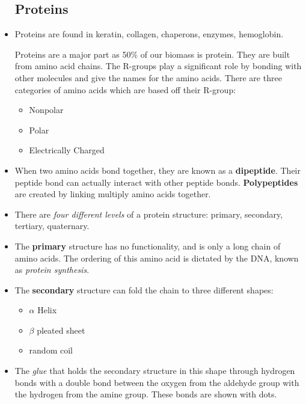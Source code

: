 \documentclass[letterpaper]{article}
\numberwithin{equation}{section}
\theoremstyle{classic}
\begin{document}
\begin{itemize}
    \subsection{Proteins}
    \item Proteins are found in keratin, collagen, chaperons, enzymes, hemoglobin.
    \begin{idea}
        Proteins are a major part as 50\% of our biomass is protein. They are built from amino acid chains. The R-groups play a significant role by bonding with other molecules and give the names for the amino acids. There are three categories of amino acids which are based off their R-group:
        \begin{multicols}{3}
        \begin{itemize}
            \item Nonpolar
            \item Polar
            \item Electrically Charged
        \end{itemize}
        \end{multicols}
    \end{idea}
    \item When two amino acids bond together, they are known as a \textbf{dipeptide}. Their peptide bond can actually interact with other peptide bonds. \textbf{Polypeptides} are created by linking multiply amino acids together.
    \item There are \textit{four different levels} of a protein structure: primary, secondary, tertiary, quaternary.
    \item The \textbf{primary} structure has no functionality, and is only a long chain of amino acids. The ordering of this amino acid is dictated by the DNA, known as \textit{protein synthesis}.
    \item The \textbf{secondary} structure can fold the chain to three different shapes:
    \begin{multicols}{3}
    \begin{itemize}
        \item $\alpha$ Helix
        \item $\beta$ pleated sheet
        \item random coil
    \end{itemize}
    \end{multicols}
    \item The \textit{glue} that holds the secondary structure in this shape through hydrogen bonds with a double bond between the oxygen from the aldehyde group with the hydrogen from the amine group. These bonds are shown with dots.

\end{itemize}
\end{document}

